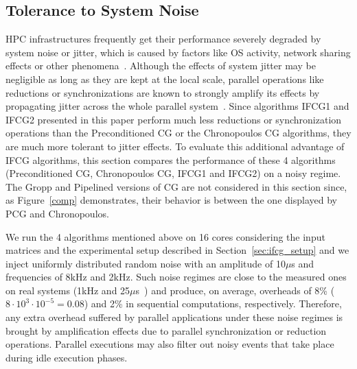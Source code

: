 \subsection{Tolerance to System Noise}
HPC infrastructures frequently get their performance severely degraded by system noise or jitter, which is caused by factors like OS activity, network sharing effects or other phenomena~\cite{Morari11}.
Although the effects of system jitter may be negligible as long as they are kept at the local scale, parallel operations like reductions or synchronizations are known to strongly amplify its effects by propagating jitter across the whole parallel system~\cite{Hoefler10}.
Since algorithms IFCG1 and IFCG2 presented in this paper perform much less reductions or synchronization operations than the Preconditioned CG or the Chronopoulos CG algorithms, they are much more tolerant to jitter effects. 
To evaluate this additional advantage of IFCG algorithms, this section compares the performance of these 4 algorithms (Preconditioned CG, Chronopoulos CG, IFCG1 and IFCG2) on a noisy regime.
The Gropp and Pipelined versions of CG are not considered in this section since, as Figure~\ref{comp} demonstrates, their behavior is between the one displayed by PCG and Chronopoulos.

We run the 4 algorithms mentioned above on 16 cores considering the input matrices and the experimental setup described in Section~\ref{sec:ifcg_setup} and we inject uniformly distributed random noise with an amplitude of 10$\mu$s and frequencies of 8kHz and 2kHz.
Such noise regimes are close to the measured ones on real systems (1kHz and 25$\mu$s~\cite{Ferreira08}) and produce, on average, overheads of 8\% ($8\cdot10^3 \cdot 10^{-5} = 0.08$) and 2\% in sequential computations, respectively.
Therefore, any extra overhead suffered by parallel applications under these noise regimes is brought by amplification effects due to parallel synchronization or reduction operations.
Parallel executions may also filter out noisy events that take place during idle execution phases.

